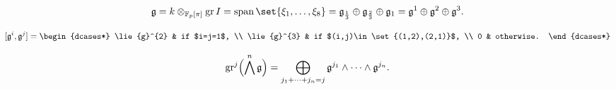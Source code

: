 \begin{equation*}
  \lie{g} = k \otimes_{\F_{p}[\pi]} \gr I = \Span\set{\xi_{1},\dotsc,\xi_{8}} = \lie{g}_{\frac{1}{3}} \oplus \lie{g}_{\frac{2}{3}} \oplus \lie{g}_{1} = \lie{g}^{1} \oplus \lie{g}^{2} \oplus \lie{g}^{3}.
\end{equation*}

\begin{equation}
  \label{eq:5}
  [\lie{g}^{i},\lie{g}^{j}] =
  \begin{dcases*}
    \lie{g}^{2} & if $i=j=1$, \\
    \lie{g}^{3} & if $(i,j)\in \set{(1,2),(2,1)}$, \\
    0 & otherwise.
  \end{dcases*}
\end{equation}

\begin{equation*}
  \operatorname{gr}^{j}\Bigl( \bigwedge^{n}\mathfrak{g} \Bigr) = \bigoplus_{j_{1} + \dotsb + j_{n} = j} \mathfrak{g}^{j_{1}} \wedge \dotsb \wedge \mathfrak{g}^{j_{n}}.
\end{equation*}

